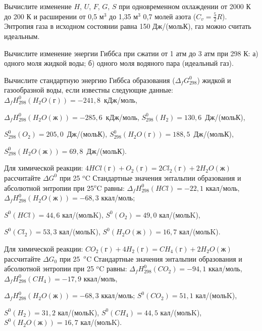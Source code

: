 \begin{Task}
Вычислите изменение $H$, $U$, $F$, $G$, $S$ при одновременном охлаждении от 2000 К до 200 К и расширении от 0,5 м$^{3}$ до 1,35 м$^{3}$ 0,7 молей азота ($C_{v}=\frac{5}{2} R$). Энтропия газа в исходном состоянии равна 150 Дж/(мольК), газ можно считать идеальным.
\end{Task}
\begin{Task}
Вычислите изменение энергии Гиббса при сжатии от 1 атм до 3 атм при 298 К: а) одного моля жидкой воды; б) одного моля водяного пара (идеальный газ).
\end{Task}
\begin{Task}
Вычислите стандартную энергию Гиббса образования ($\Delta_{f}G_{298}^{0}$) жидкой и газообразной воды, если известны следующие данные: 
$\Delta_{f}H_{298}^{0}(H_{2}O(\textrm{г})) = -241,8 $~кДж/моль,  

$\Delta_{f}H_{298}^{0}(H_{2}O(\textrm{ж})) = -285,6$~кДж/моль, 
$S_{298}^{0}(H_{2}) = 130,6$~Дж/(мольК), 

$S_{298}^{0}(O_{2}) = 205,0$~Дж/(мольК),  $S_{298}^{0}(H_{2}O(\textrm{г})) = 188,5$~Дж/(мольК), 

$S_{298}^{0}(H_{2}O(\textrm{ж})) = 69,8$~Дж/(мольК).
\end{Task}
\begin{Task}
Для химической реакции:
$4HCl(\textrm{г}) + O_{2}(\textrm{г}) = 2Cl_{2}(\textrm{г}) + 2H_{2}O(\textrm{ж})$ рассчитайте $\Delta G^{0}$ при 25 $^{o}$C 
Стандартные значения энтальпии образования и абсолютной энтропии при 25$^{o}$C равны: 
$\Delta_{f}H_{298}^{0}(HCl) = -22,1$ ккал/моль, $\Delta_{f}H_{298}^{0}(H_{2}O(\textrm{ж})) = -68,3$ ккал/моль; 

$S^{0}(HCl) = 44,6$ кал/(мольK), $S^{0}(O_{2}) = 49,0$ кал/(мольK), 

$S^{0}(Cl_{2}) = 53,3$ кал/(мольK), $S^{0}(H_{2}O(\textrm{ж})) = 16,7$ кал/(мольK).
\end{Task}
\begin{Task}
Для химической реакции:
$CO_{2}(\textrm{г}) + 4H_{2}(\textrm{г}) = CH_{4}(\textrm{г}) + 2H_{2}O(\textrm{ж})$ рассчитайте $\Delta G_{0}$ при 25~$^{o}$C 
Стандартные значения энтальпии образования и абсолютной энтропии при 25 $^{o}$C равны: 
$\Delta_{f}H_{298}^{0}(CO_{2})=-94,1$ ккал/моль,  $\Delta_{f}H_{298}^{0}(CH_{4}) = -17,9$ ккал/моль,  

$\Delta_{f}H_{298}^{0}(H_{2}O(\textrm{ж})) = -68,3$ ккал/моль; 
$S^{0}(CO_{2}) = 51,1$ кал/(мольK), 

$S^{0}(H_{2}) = 31,2$ кал/(мольK),
$S^{0}(CH_{4}) = 44,5$ кал/(мольK), $S^{0}(H_{2}O(\textrm{ж})) = 16,7$ кал/(мольK).
\end{Task}

